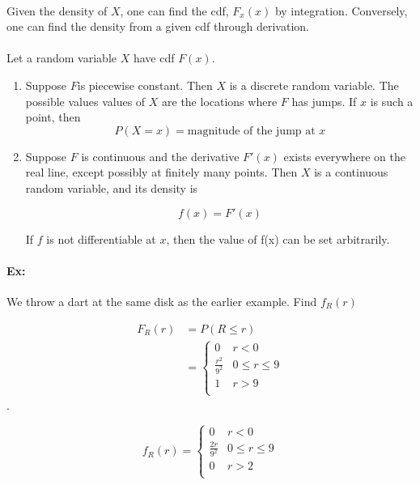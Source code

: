 \documentclass{article}
\begin{document}
    \paragraph{}Given the density of $X$, one can find the cdf, $F_x(x)$ by integration. Conversely, one can find
    the density from a given cdf through derivation.
    \paragraph{}Let a random variable $X$ have cdf $F(x)$.
    \begin{enumerate}[label=(\alph*).]
        \item Suppose $F$is piecewise constant. Then $X$ is a discrete random variable. The possible values
            values of $X$ are the locations where $F$ has jumps. If $x$ is such a point, then
            \[
                P(X = x) = \text{magnitude of the jump at }x
            \]

        \item Suppose $F$ is continuous and the derivative $F'(x)$ exists everywhere on the real line, except
            possibly at finitely many points. Then $X$ is a continuous random variable, and its density is

            
            \[
                f(x) = F'(x)
            \]

        If $f$ is not differentiable at $x$, then the value of f(x) can be set arbitrarily.
    \end{enumerate}
    \paragraph{Ex:} We throw a dart at the same disk as the earlier example. Find $f_R(r)$
    
    \begin{align*}
        F_R(r) &= P(R \le r)\\
               &= \begin{cases}
                   0 & r < 0 \\
                   \frac{r^2}{9^2} & 0\le r \le 9 \\
                   1 & r > 9 \\
                   \end{cases}
    \end{align*}.
    
    \[ f_R(r) = \begin{cases}
        0 & r < 0 \\
        \frac{2r}{9^2} & 0 \le r \le 9 \\
        0& r> 2 \\
        \end{cases}
    \]
\end{document}
